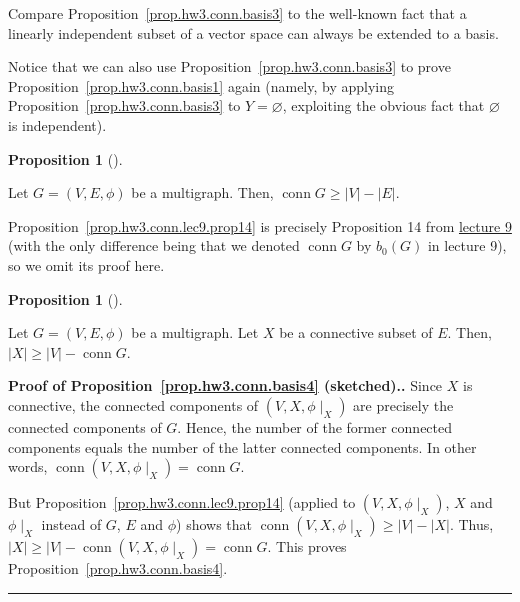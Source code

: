 \documentclass[numbers=enddot,12pt,final,onecolumn,notitlepage]{scrartcl}%
\theoremstyle{definition}
\newtheorem{prop}[theo]{Proposition}
\newenvironment{proposition}[1][]
{\begin{prop}[#1]\begin{leftbar}}
{\end{leftbar}\end{prop}}
\newenvironment{proof}[1][Proof]{\noindent\textbf{#1.} }{\ \rule{0.5em}{0.5em}}
\newcommand{\conn}{\operatorname{conn}}
\newcommand{\abs}[1]{\left| #1 \right|}
\newcommand{\tup}[1]{\left( #1 \right)}
\begin{document}
Compare Proposition~\ref{prop.hw3.conn.basis3} to the well-known
fact that a linearly independent subset of a vector space can always
be extended to a basis.

Notice that we can also use Proposition~\ref{prop.hw3.conn.basis3}
to prove Proposition~\ref{prop.hw3.conn.basis1} again
(namely, by applying Proposition~\ref{prop.hw3.conn.basis3}
to $Y = \varnothing$, exploiting the obvious fact that
$\varnothing$ is independent).

\begin{proposition} \label{prop.hw3.conn.lec9.prop14}
Let $G = \tup{V, E, \phi}$ be a multigraph.
Then, $\conn G \geq \abs{V} - \abs{E}$.
\end{proposition}

Proposition~\ref{prop.hw3.conn.lec9.prop14} is precisely
Proposition 14 from
\href{http://www.cip.ifi.lmu.de/~grinberg/t/17s/5707lec9.pdf}{lecture 9}
(with the only difference being that we denoted $\conn G$
by $b_0 \tup{G}$ in lecture 9),
so we omit its proof here.

\begin{proposition} \label{prop.hw3.conn.basis4}
Let $G = \tup{V, E, \phi}$ be a multigraph.
Let $X$ be a connective subset of $E$.
Then, $\abs{X} \geq \abs{V} - \conn G$.
\end{proposition}

\begin{proof}[Proof of Proposition~\ref{prop.hw3.conn.basis4}
(sketched).]
Since $X$ is connective, the connected components of
$\tup{V, X, \phi\mid_X}$ are precisely the connected components
of $G$.
Hence, the number of the former connected components equals the
number of the latter connected components.
In other words, $\conn \tup{V, X, \phi\mid_X} = \conn G$.

But Proposition~\ref{prop.hw3.conn.lec9.prop14}
(applied to $\tup{V, X, \phi\mid_X}$, $X$ and $\phi\mid_X$ instead of
$G$, $E$ and $\phi$) shows that
$\conn \tup{V, X, \phi\mid_X} \geq \abs{V} - \abs{X}$.
Thus,
$\abs{X} \geq \abs{V} - \conn \tup{V, X, \phi\mid_X}
= \conn G$.
This proves Proposition~\ref{prop.hw3.conn.basis4}.
\end{proof}
\end{document}
